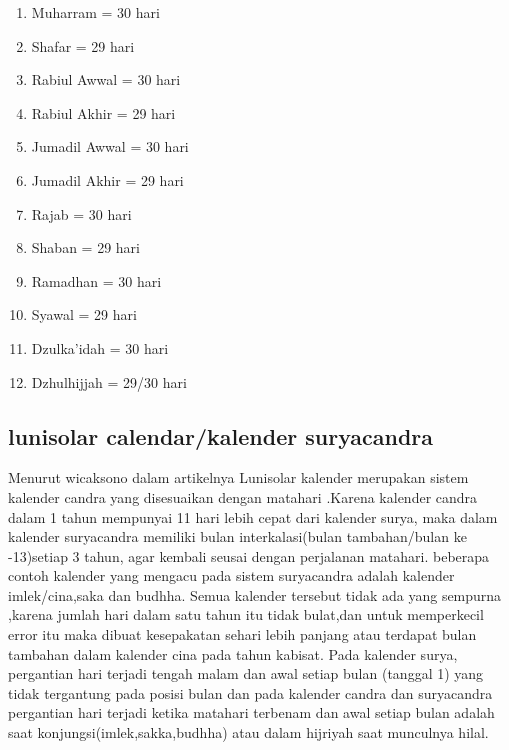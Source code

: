     \begin{enumerate}
        \item Muharram      = 30 hari
        \item Shafar        = 29 hari
        \item Rabiul Awwal  = 30 hari
        \item Rabiul Akhir  = 29 hari
        \item Jumadil Awwal = 30 hari
        \item Jumadil Akhir = 29 hari
        \item Rajab         = 30 hari
        \item Shaban        = 29 hari
        \item Ramadhan      = 30 hari
        \item Syawal        = 29 hari
        \item Dzulka'idah   = 30 hari
        \item Dzhulhijjah   = 29/30 hari
    \end{enumerate}

  \subsection{lunisolar calendar/kalender suryacandra}

      Menurut wicaksono dalam artikelnya Lunisolar kalender merupakan sistem kalender candra yang disesuaikan dengan matahari \cite{wicaksono2008ta}.Karena kalender candra dalam 1 tahun mempunyai 11 hari lebih cepat dari kalender surya, maka dalam kalender suryacandra memiliki bulan interkalasi(bulan tambahan/bulan ke -13)setiap 3 tahun, agar kembali seusai dengan perjalanan matahari.
    beberapa contoh kalender yang mengacu pada sistem suryacandra adalah kalender imlek/cina,saka dan budhha. Semua kalender tersebut tidak ada yang sempurna ,karena jumlah hari dalam satu tahun itu tidak bulat,dan untuk memperkecil error itu maka dibuat kesepakatan sehari lebih panjang atau terdapat bulan tambahan dalam kalender cina pada tahun kabisat\cite{wicaksono2008ta}.
    Pada kalender surya, pergantian hari terjadi tengah malam dan awal setiap bulan (tanggal 1) yang tidak tergantung pada posisi bulan dan pada kalender candra dan suryacandra pergantian hari terjadi ketika matahari terbenam dan awal setiap bulan adalah saat konjungsi(imlek,sakka,budhha) atau dalam hijriyah saat munculnya hilal.
